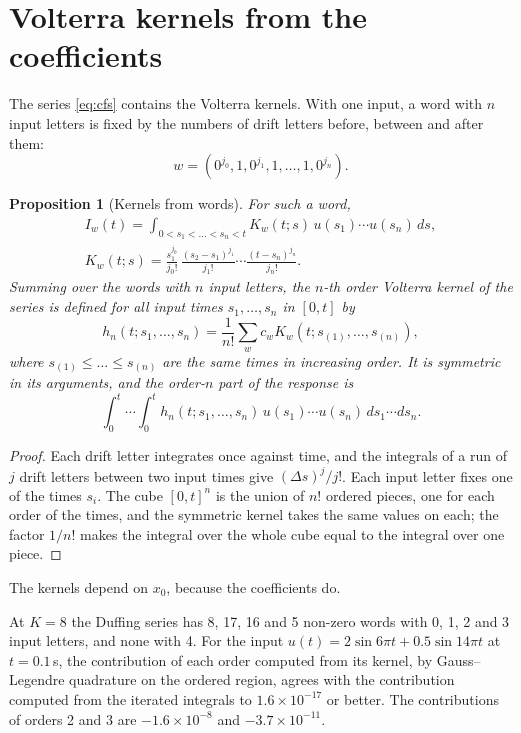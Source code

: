 \documentclass[11pt,a4paper]{article}
\newtheorem{proposition}{Proposition}
\theoremstyle{remark}
\begin{document}
\section{Volterra kernels from the coefficients}\label{sec:kernels}
The series \eqref{eq:cfs} contains the Volterra kernels.
With one input, a word with $n$ input letters is fixed by the numbers of drift letters before, between and after them:
\[w=(0^{j_0},1,0^{j_1},1,\dots,1,0^{j_n}).\]
\begin{proposition}[Kernels from words]\label{prop:kernel}
For such a word,
\begin{gather*}
I_w(t)=\int_{0<s_1<\dots<s_n<t}K_w(t;s)\,u(s_1)\cdots u(s_n)\,ds,\\
K_w(t;s)=\frac{s_1^{j_0}}{j_0!}\,\frac{(s_2-s_1)^{j_1}}{j_1!}\cdots\frac{(t-s_n)^{j_n}}{j_n!} .
\end{gather*}
Summing over the words with $n$ input letters, the $n$-th order Volterra kernel of the series is defined for all input times $s_1,\dots,s_n$ in $[0,t]$ by
\[h_n(t;s_1,\dots,s_n)=\frac1{n!}\sum_wc_wK_w(t;s_{(1)},\dots,s_{(n)}),\]
where $s_{(1)}\le\dots\le s_{(n)}$ are the same times in increasing order.
It is symmetric in its arguments, and the order-$n$ part of the response is
\[\int_0^t\!\!\cdots\!\int_0^th_n(t;s_1,\dots,s_n)\,u(s_1)\cdots u(s_n)\,ds_1\cdots ds_n .\]
\end{proposition}
\begin{proof}
Each drift letter integrates once against time, and the integrals of a run of $j$ drift letters between two input times give $(\Delta s)^j/j!$.
Each input letter fixes one of the times $s_i$.
The cube $[0,t]^n$ is the union of $n!$ ordered pieces, one for each order of the times, and the symmetric kernel takes the same values on each; the factor $1/n!$ makes the integral over the whole cube equal to the integral over one piece.
\end{proof}
The kernels depend on $x_0$, because the coefficients do.

At $K=8$ the Duffing series has 8, 17, 16 and 5 non-zero words with 0, 1, 2 and 3 input letters, and none with 4.
For the input $u(t)=2\sin 6\pi t+0.5\sin 14\pi t$ at $t=0.1$\,s, the contribution of each order computed from its kernel, by Gauss--Legendre quadrature on the ordered region, agrees with the contribution computed from the iterated integrals to $1.6\times10^{-17}$ or better.
The contributions of orders 2 and 3 are $-1.6\times10^{-8}$ and $-3.7\times10^{-11}$.
\end{document}
